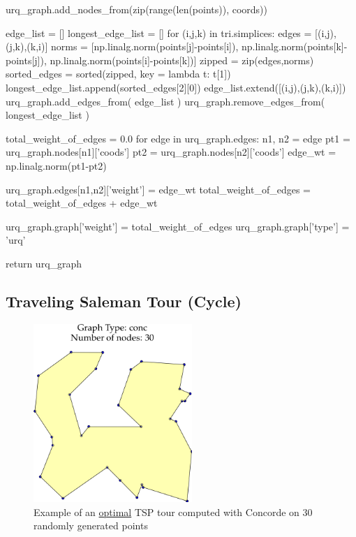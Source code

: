      urq_graph.add_nodes_from(zip(range(len(points)), coords))

     edge_list = []
     longest_edge_list = []
     for (i,j,k) in tri.simplices:
         edges = [(i,j),(j,k),(k,i)]
         norms = [np.linalg.norm(points[j]-points[i]),
                  np.linalg.norm(points[k]-points[j]),
                  np.linalg.norm(points[i]-points[k])]
         zipped = zip(edges,norms)
         sorted_edges = sorted(zipped, key = lambda t: t[1])
         longest_edge_list.append(sorted_edges[2][0])
         edge_list.extend([(i,j),(j,k),(k,i)])    
     urq_graph.add_edges_from( edge_list )
     urq_graph.remove_edges_from( longest_edge_list )
     
     total_weight_of_edges = 0.0
     for edge in urq_graph.edges:
           n1, n2 = edge
           pt1 = urq_graph.nodes[n1]['coods'] 
           pt2 = urq_graph.nodes[n2]['coods']
           edge_wt = np.linalg.norm(pt1-pt2)

           urq_graph.edges[n1,n2]['weight'] = edge_wt
           total_weight_of_edges = total_weight_of_edges + edge_wt 
     
     urq_graph.graph['weight'] = total_weight_of_edges
     urq_graph.graph['type']   = 'urq'

     return urq_graph
\nwendcode{}\nwdocspar






\subsection{Traveling Saleman Tour (Cycle)}

\begin{figure}[ht]
  \centering
  \includegraphics[width=6cm]{./miscimages/conc-example.png}
  \caption{\label{fig:tsp} Example of an \underline{optimal} TSP tour computed with Concorde  on 30 randomly generated points }
\end{figure}


